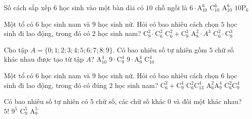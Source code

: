 \begin{ex}%
Số cách sắp xếp $6$ học sinh vào một bàn dài có $10$ chỗ ngồi là
\choice
{$6\cdot \mathrm{A}_{10}^{6}$}
{\True $\mathrm{C}_{10}^{6}$}
{$\mathrm{A}_{10}^{6}$}
{$10\mathrm{P}_{6}$}
\end{ex}

\begin{ex}%
Một tổ có $6$ học sinh nam và $9$ học sinh nữ. Hỏi có bao nhiêu cách chọn $5$ học sinh đi lao động, trong đó có $2$ học sinh nam?
\choice
{$\mathrm{C}_{9}^{2} \cdot \mathrm{C}_{6}^{2}$}
{$\mathrm{C}_{6}^{2}+\mathrm{C}_{9}^{3}$}
{$\mathrm{A}_{8}^{2} \cdot A^{3}$}
{\True $\mathrm{C}_{6}^{2} \cdot \mathrm{C}_{9}^{3}$}
\end{ex}

\begin{ex}%
Cho tập $A=\{0; 1; 2; 3; 4; 5; 6; 7; 8; 9\}$. Có bao nhiêu số tự nhiên gồm $5$ chữ số khác nhau được tạo từ tập $A$?
\choice
{$\mathrm{A}_{10}^{4}$}
{$9\cdot\mathrm{C}_{9}^{4}$}
{\True $9\cdot\mathrm{A}_{9}^{4}$}
{$\mathrm{C}_{10}^{4}$}
\end{ex}

\begin{ex}%
Một tổ có $6$ học sinh nam và $9$ học sinh nữ. Hỏi có bao nhiêu cách chọn $6$ học sinh đi lao động, trong đó có đúng $2$ học sinh nam?
\choice
{$\mathrm{C}_{6}^{2}+\mathrm{C}_{9}^{4}$}
{$\mathrm{C}_{6}^{2} \mathrm{C}_{13}^{4}$}
{$\mathrm{A}_{6}^{2} \mathrm{A}_{9}^{4}$}
{\True $\mathrm{C}_{6}^{2} \mathrm{C}_{9}^{4}$}
\end{ex}

\begin{ex}%
Có bao nhiêu số tự nhiên có $5$ chữ số, các chữ số khác $0$ và đôi một khác nhau?
\choice
{$5!$}
{$9^{5}$}
{$\mathrm{C}_{9}^{5}$}
{\True $\mathrm{A}_{9}^{5}$}
\end{ex}

